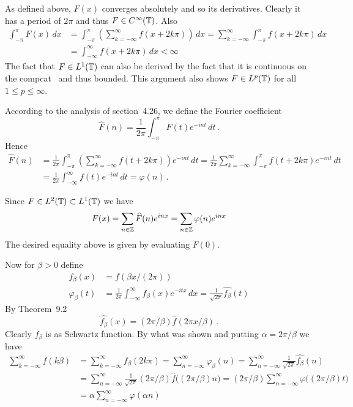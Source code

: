 \begin{enumerate}
As defined above, \(F(x)\) converges absolutely and so its 
derivatives. Clearly it has a period of \(2\pi\) and
thus \(F\in C^\infty(\mathbb{T})\). Also
\begin{align*}
\int_{-\pi}^\pi F(x)\,dx 
&= \int_{-\pi}^\pi \left(\sum_{k = -\infty}^\infty f(x + 2k\pi)\right)\,dx
   = \sum_{k = -\infty}^\infty \int_{-\pi}^\pi f(x + 2k\pi)\,dx \\
&= \int_{-\infty}^\infty f(x + 2k\pi)\,dx < \infty
\end{align*}
The fact that \(F\in L^1(\mathbb{T})\) can also be derived 
by the fact that it is continuous on the compcat \T\ and thus bounded.
This argument also shows \(F\in L^p(\mathbb{T})\) for all \(1\leq p \leq \infty\).

According to the analysis of section~4.26, we define the Fourier coefficient
\begin{equation*}
\widehat{F}(n) = \frac{1}{2\pi} \int_{-\pi}^\pi F(t)e^{-int}\,dt\,.
\end{equation*}
Hence
\begin{align*}
\widehat{F}(n) 
&= \frac{1}{2\pi} \int_{-\pi}^\pi 
     \left(\sum_{k = -\infty}^\infty f(t + 2k\pi)\right)e^{-int}\,dt
 = \frac{1}{2\pi} \sum_{k = -\infty}^\infty
     \int_{-\pi}^\pi f(t + 2k\pi)e^{-int}\,dt \\
&= \frac{1}{2\pi} \int_{-\infty}^\infty f(t)e^{-int}\,dt 
 = \varphi(n)\,.
\end{align*}

Since \(F\in L^2(\mathbb{T}) \subset L^1(\mathbb{T})\) we have
\begin{equation*}
F(x) = \sum_{n\in\mathbb{Z}} \widehat{F}(n)e^{inx} = \sum_{n\in\mathbb{Z}} \varphi(n)e^{inx}
\end{equation*}
The desired equality above is given by evaluating \(F(0)\).

Now for \(\beta > 0\) define
\begin{align*}
f_\beta(x) &= f(\beta x/(2\pi))\\
\varphi_\beta(t) 
  &= \frac{1}{2\pi} \int_{-\infty}^\infty f_\beta(x)e^{-itx}\,dx
   = \frac{1}{\sqrt{2\pi}} \widehat{f_\beta}(t)
\end{align*}
By Theorem~9.2 
\begin{equation*}
\widehat{f_\beta}(x) = (2\pi/\beta)\widehat{f}(2\pi x/\beta)\,.
\end{equation*}
Clearly \(f_\beta\) is as Schwartz function. By what was shown
and putting \(\alpha = 2\pi/\beta\) we have
\begin{align*}
\sum_{k = -\infty}^\infty f(k\beta) 
&= \sum_{k = -\infty}^\infty f_\beta(2k\pi) 
 = \sum_{n = -\infty}^\infty \varphi_\beta(n)
 = \sum_{n = -\infty}^\infty \frac{1}{\sqrt{2\pi}} \widehat{f_\beta}(n) \\
&= \sum_{n = -\infty}^\infty 
   \frac{1}{\sqrt{2\pi}} (2\pi/\beta)\widehat{f}\bigl((2\pi/\beta)n\bigr)
 = (2\pi/\beta) \sum_{n = -\infty}^\infty 
   \varphi\bigl((2\pi/\beta)t\bigr) \\
&= \alpha \sum_{n = -\infty}^\infty  \varphi(\alpha n)
\end{align*}


\end{enumerate}
